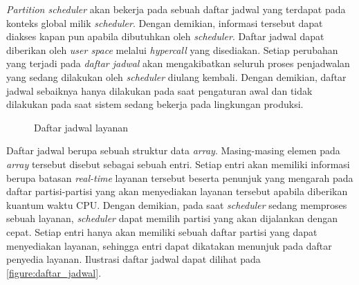 \textit{Partition scheduler} akan bekerja pada sebuah daftar jadwal yang terdapat pada konteks
global milik \textit{scheduler}. Dengan demikian, informasi tersebut dapat diakses kapan pun
apabila dibutuhkan oleh \textit{scheduler}. Daftar jadwal dapat diberikan oleh \textit{user
space} melalui \textit{hypercall} yang disediakan. Setiap perubahan yang terjadi pada
\textit{daftar jadwal} akan mengakibatkan seluruh proses penjadwalan yang sedang dilakukan oleh
\textit{scheduler} diulang kembali. Dengan demikian, daftar jadwal sebaiknya hanya dilakukan
pada saat pengaturan awal dan tidak dilakukan pada saat sistem sedang bekerja pada lingkungan
produksi.

\begin{figure}[h]
	\centering

	\vspace{20pt}

	\caption{Daftar jadwal layanan}
	\label{figure:daftar_jadwal}
\end{figure}

Daftar jadwal berupa sebuah struktur data \textit{array}. Masing-masing elemen pada
\textit{array} tersebut disebut sebagai sebuah entri. Setiap entri akan memiliki informasi
berupa batasan \textit{real-time} layanan tersebut beserta penunjuk yang mengarah pada daftar
partisi-partisi yang akan menyediakan layanan tersebut apabila diberikan kuantum waktu CPU. Dengan
demikian, pada saat \textit{scheduler} sedang memproses sebuah layanan, \textit{scheduler} dapat
memilih partisi yang akan dijalankan dengan cepat. Setiap entri hanya akan memiliki sebuah
daftar partisi yang dapat menyediakan layanan, sehingga entri dapat dikatakan menunjuk pada
daftar penyedia layanan. Ilustrasi daftar jadwal dapat dilihat pada
\autoref{figure:daftar_jadwal}.

